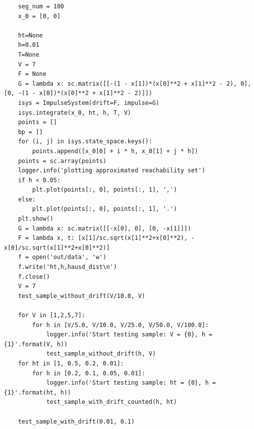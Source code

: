 \documentclass[a4paper,12pt]{article}
\begin{document}
\begin{verbatim}
    seg_num = 100
    x_0 = [0, 0]

    ht=None
    h=0.01
    T=None
    V = 7
    F = None
    G = lambda x: sc.matrix([[-(1 - x[1])*(x[0]**2 + x[1]**2 - 2), 0], [0, -(1 - x[0])*(x[0]**2 + x[1]**2 - 2)]])
    isys = ImpulseSystem(drift=F, impulse=G)
    isys.integrate(x_0, ht, h, T, V)
    points = []
    bp = []
    for (i, j) in isys.state_space.keys():
        points.append([x_0[0] + i * h, x_0[1] + j * h])
    points = sc.array(points)
    logger.info('plotting approximated reachability set')
    if h < 0.05:
        plt.plot(points[:, 0], points[:, 1], ',')
    else:
        plt.plot(points[:, 0], points[:, 1], '.')
    plt.show()
    G = lambda x: sc.matrix([[-x[0], 0], [0, -x[1]]])
    F = lambda x, t: [x[1]/sc.sqrt(x[1]**2+x[0]**2), -x[0]/sc.sqrt(x[1]**2+x[0]**2)]
    f = open('out/data', 'w')
    f.write('ht,h,hausd_dist\n')
    f.close()
    V = 7
    test_sample_without_drift(V/10.0, V)

    for V in [1,2,5,7]:
        for h in [V/5.0, V/10.0, V/25.0, V/50.0, V/100.0]:
            logger.info('Start testing sample: V = {0}, h = {1}'.format(V, h))
            test_sample_without_drift(h, V)
    for ht in [1, 0.5, 0.2, 0.01]:
        for h in [0.2, 0.1, 0.05, 0.01]:
            logger.info('Start testing sample: ht = {0}, h = {1}'.format(ht, h))
            test_sample_with_drift_counted(h, ht)

    test_sample_with_drift(0.01, 0.1)

\end{verbatim}
\end{document}
